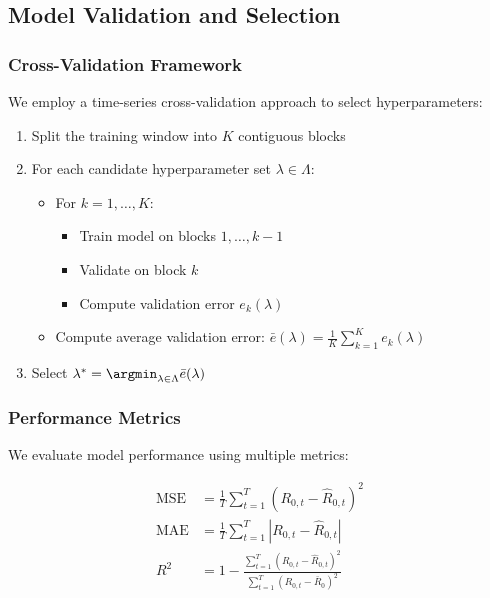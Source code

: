 \subsection{Model Validation and Selection}

\subsubsection{Cross-Validation Framework}
We employ a time-series cross-validation approach to select hyperparameters:

\begin{enumerate}
    \item Split the training window into $K$ contiguous blocks
    \item For each candidate hyperparameter set $\lambda \in \Lambda$:
        \begin{itemize}
            \item For $k = 1,\ldots,K$:
                \begin{itemize}
                    \item Train model on blocks $1,\ldots,k-1$
                    \item Validate on block $k$
                    \item Compute validation error $e_k(\lambda)$
                \end{itemize}
            \item Compute average validation error: $\bar{e}(\lambda) = \frac{1}{K}\sum_{k=1}^K e_k(\lambda)$
        \end{itemize}
    \item Select $\lambda^* = \argmin_{\lambda \in \Lambda} \bar{e}(\lambda)$
\end{enumerate}

\subsubsection{Performance Metrics}
We evaluate model performance using multiple metrics:

\begin{equation}
\begin{aligned}
    \text{MSE} &= \frac{1}{T}\sum_{t=1}^T (R_{0,t} - \hat{R}_{0,t})^2 \\
    \text{MAE} &= \frac{1}{T}\sum_{t=1}^T |R_{0,t} - \hat{R}_{0,t}| \\
    R^2 &= 1 - \frac{\sum_{t=1}^T (R_{0,t} - \hat{R}_{0,t})^2}{\sum_{t=1}^T (R_{0,t} - \bar{R}_0)^2}
\end{aligned}
\end{equation}

